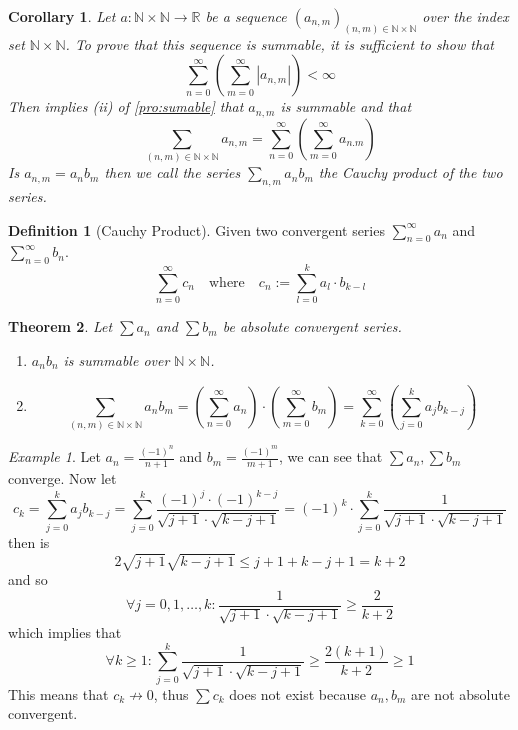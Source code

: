 \documentclass[english,titlepage]{uzhpub}
\theoremstyle{definition}
\newtheorem{definition}{Definition}[section]
\theoremstyle{plain}
\newtheorem{theorem}[definition]{Theorem} %
\newtheorem{corollary}{Corollary}[theorem]
\theoremstyle{remark}
\theoremstyle{example}
\newtheorem*{example}{Example}
\begin{document}
   \begin{corollary}
      Let \(a: \mathbb{N} \times \mathbb{N} \to \mathbb{R}\) be a sequence \((a_{n,m})_{(n,m) \in \mathbb{N} \times \mathbb{N}}\) over the index set \(\mathbb{N} \times \mathbb{N}\).
      To prove that this sequence is summable, it is sufficient to show that
      \[\sum_{n=0}^\infty\left(\sum_{m=0}^\infty |a_{n,m}|\right) < \infty\]
      Then implies (ii) of \cref{pro:sumable} that \(a_{n,m}\) is summable and that
      \[\sum_{(n,m) \in \mathbb{N} \times \mathbb{N}} a_{n,m} = \sum_{n=0}^\infty\left(\sum_{m=0}^\infty a_{n.m}\right)\]
      Is \(a_{n,m} = a_nb_m\) then we call the series \(\sum_{n,m}a_nb_m\) the Cauchy product of the two series.
   \end{corollary}

   \begin{definition}[Cauchy Product]
      Given two convergent series \(\sum_{n=0}^\infty a_n\) and \(\sum_{n=0}^\infty b_n\).
      \[\sum_{n=0}^\infty c_n \quad\text{where}\quad c_n := \sum_{l=0}^k a_l \cdot b_{k-l}\]
   \end{definition}

   \begin{theorem}\label{thm:cauchy_product}
      Let \(\sum a_n\) and \(\sum b_m\) be absolute convergent series.
      \begin{enumerate}[label=\roman*, align=Center]
         \item \(a_nb_n\) is summable over \(\mathbb{N} \times \mathbb{N}\).
         \item
            \[\sum_{(n,m) \in \mathbb{N} \times \mathbb{N}} a_nb_m = \left(\sum_{n=0}^\infty a_n\right) \cdot \left(\sum_{m=0}^\infty b_m\right) = \sum_{k=0}^\infty \left(\sum_{j=0}^k a_j b_{k-j}\right)\]
      \end{enumerate}
   \end{theorem}
   \begin{example}
      Let \(a_n = \frac{(-1)^n}{n+1}\) and \(b_m = \frac{(-1)^m}{m+1}\), we can see that \(\sum a_n, \sum b_m\) converge.
      Now let
      \[c_k = \sum_{j=0}^k a_jb_{k-j} = \sum_{j=0}^k \frac{(-1)^j \cdot (-1)^{k-j}}{\sqrt{j+1} \cdot \sqrt{k-j+1}} = (-1)^k \cdot \sum_{j=0}^k \frac{1}{\sqrt{j+1} \cdot \sqrt{k-j+1}}\]
      then is
      \[2 \sqrt{j+1} \sqrt{k-j+1} \leq j+1+k-j+1 = k+2\]
      and so
      \[\forall j = 0, 1, \ldots, k: \frac{1}{\sqrt{j+1} \cdot \sqrt{k-j+1}} \geq \frac{2}{k+2}\]
      which implies that
      \[\forall k \geq 1: \sum_{j=0}^k \frac{1}{\sqrt{j+1} \cdot \sqrt{k-j+1}} \geq \frac{2(k+1)}{k+2} \geq 1\]
      This means that \(c_k \not\to 0\), thus \(\sum c_k\) does not exist because \(a_n, b_m\) are not absolute convergent.
   \end{example}
\end{document}
